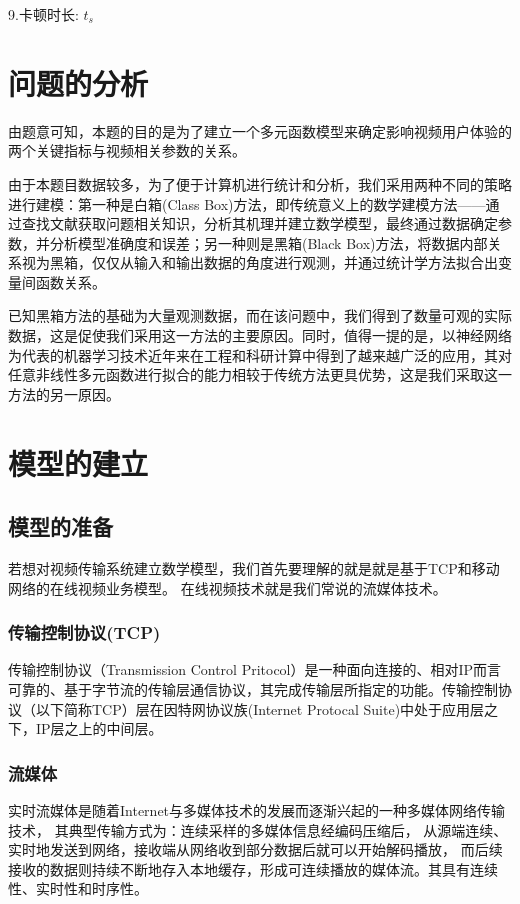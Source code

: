 \documentclass[UTF8]{ctexart}
\begin{document}
9.卡顿时长: $t_{s} $

\section{问题的分析}
由题意可知，本题的目的是为了建立一个多元函数模型来确定影响视频用户体验的两个关键指标与视频相关参数的关系。

由于本题目数据较多，为了便于计算机进行统计和分析，我们采用两种不同的策略进行建模：第一种是白箱(Class Box)方法，即传统意义上的数学建模方法——通过查找文献获取问题相关知识，分析其机理并建立数学模型，最终通过数据确定参数，并分析模型准确度和误差；另一种则是黑箱(Black Box)方法，将数据内部关系视为黑箱，仅仅从输入和输出数据的角度进行观测，并通过统计学方法拟合出变量间函数关系。

已知黑箱方法的基础为大量观测数据，而在该问题中，我们得到了数量可观的实际数据，这是促使我们采用这一方法的主要原因。同时，值得一提的是，以神经网络为代表的机器学习技术近年来在工程和科研计算中得到了越来越广泛的应用，其对任意非线性多元函数进行拟合的能力相较于传统方法更具优势，这是我们采取这一方法的另一原因。
\section{模型的建立}
\subsection{模型的准备}
若想对视频传输系统建立数学模型，我们首先要理解的就是就是基于TCP和移动网络的在线视频业务模型。
在线视频技术就是我们常说的流媒体技术。
\subsubsection{传输控制协议(TCP)}
传输控制协议（Transmission Control Pritocol）是一种面向连接的、相对IP而言可靠的、基于字节流的传输层通信协议，其完成传输层所指定的功能。传输控制协议（以下简称TCP）层在因特网协议族(Internet Protocal Suite)中处于应用层之下，IP层之上的中间层。


\subsubsection{流媒体}
实时流媒体是随着Internet与多媒体技术的发展而逐渐兴起的一种多媒体网络传输技术，
其典型传输方式为：连续采样的多媒体信息经编码压缩后，
从源端连续、实时地发送到网络，接收端从网络收到部分数据后就可以开始解码播放，
而后续接收的数据则持续不断地存入本地缓存，形成可连续播放的媒体流。其具有连续性、实时性和时序性。
\end{document}
